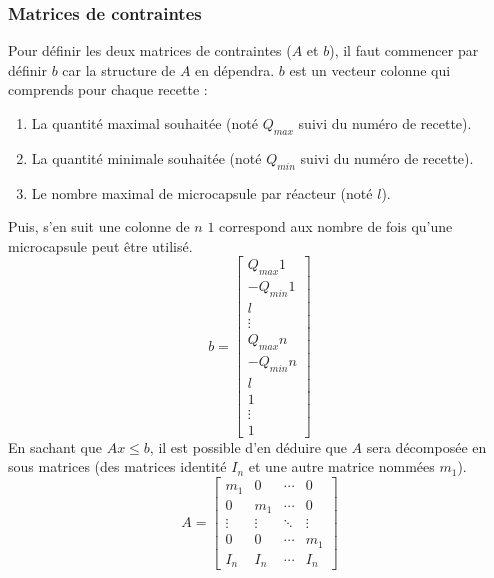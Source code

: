 \subsubsection{Matrices de contraintes}\label{subsubsection:contraintes}
Pour définir les deux matrices de contraintes ($A$ et $b$), il faut commencer par définir $b$ car la structure de $A$ en dépendra.
$b$ est un vecteur colonne qui comprends pour chaque recette :
\begin{enumerate}
    \item La quantité maximal souhaitée (noté $Q_{max}$ suivi du numéro de recette).
    \item La quantité minimale souhaitée (noté $Q_{min}$ suivi du numéro de recette).
    \item Le nombre maximal de microcapsule par réacteur (noté $l$).
\end{enumerate}
Puis, s'en suit une colonne de $n$ $1$ correspond aux nombre de fois qu'une microcapsule peut être utilisé.
\begin{equation}
    b = \left[
        \begin{array}{c}
            Q_{max}1\\
            -Q_{min}1\\
            l\\
            \vdots\\
            Q_{max}n\\
            -Q_{min}n\\
            l\\
                1 \\
                \vdots \\
                1
        \end{array}
    \right]
\end{equation}
En sachant que $Ax \leq b$, il est possible d'en déduire que $A$ sera décomposée en sous matrices (des matrices identité $I_n$ et une autre matrice nommées $m_1$).
\begin{equation}
    A = \left[\begin{array}{cccc}
        m_1    & 0       & \cdots & 0\\
        0      & m_1     & \cdots & 0\\
        \vdots & \vdots  & \ddots & \vdots \\
        0      & 0       & \cdots &  m_1 \\
        I_n    & I_n     & \cdots &  I_n
    \end{array}\right]
\end{equation}
